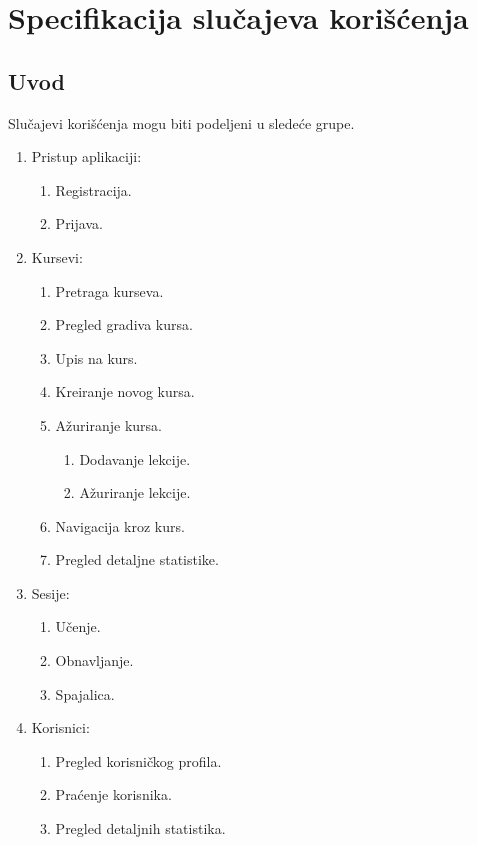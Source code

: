\part{Specifikacija slučajeva korišćenja}

\chapter{Uvod}
Slučajevi korišćenja mogu biti podeljeni u sledeće grupe.
\begin{enumerate}
  \item Pristup aplikaciji:
  \begin{enumerate}
    \item Registracija.
    \item Prijava.
  \end{enumerate}
  \item Kursevi:
  \begin{enumerate}
    \item Pretraga kurseva.
	\item Pregled gradiva kursa.
    \item Upis na kurs.
    \item Kreiranje novog kursa.
    \item Ažuriranje kursa.
    \begin{enumerate}
      \item Dodavanje lekcije.
      \item Ažuriranje lekcije.
    \end{enumerate}
    \item Navigacija kroz kurs.
    \item Pregled detaljne statistike.
  \end{enumerate}
  \item Sesije:
  \begin{enumerate}
    \item Učenje.
    \item Obnavljanje.
    \item Spajalica.
  \end{enumerate}
  \item Korisnici:
  \begin{enumerate}
    \item Pregled korisničkog profila.
    \item Praćenje korisnika.
    \item Pregled detaljnih statistika.
  \end{enumerate}
\end{enumerate}



